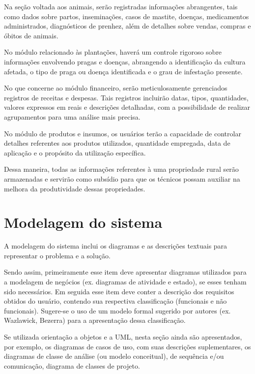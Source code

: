 Na seção voltada aos animais, serão registradas informações abrangentes, tais como dados sobre partos, inseminações, casos de mastite, doenças, medicamentos administrados, diagnósticos de prenhez, além de detalhes sobre vendas, compras e óbitos de animais.

No módulo relacionado às plantações, haverá um controle rigoroso sobre informações envolvendo pragas e doenças, abrangendo a identificação da cultura afetada, o tipo de praga ou doença identificada e o grau de infestação presente.

No que concerne ao módulo financeiro, serão meticulosamente gerenciados registros de receitas e despesas. Tais registros incluirão datas, tipos, quantidades, valores expressos em reais e descrições detalhadas, com a possibilidade de realizar agrupamentos para uma análise mais precisa.

No módulo de produtos e insumos, os usuários terão a capacidade de controlar detalhes referentes aos produtos utilizados, quantidade empregada, data de aplicação e o propósito da utilização específica.

Dessa maneira, todas as informações referentes à uma propriedade rural serão armazenadas e servirão como subsídio para que os técnicos possam auxiliar na melhora da produtividade dessas propriedades.


\section{Modelagem do sistema}\label{sec:modelagemSistema}

A modelagem do sistema inclui os diagramas e as descrições textuais para representar o problema e a solução.

Sendo assim, primeiramente esse item deve apresentar diagramas utilizados para a modelagem de negócios (ex. diagramas de atividade e estado), se esses tenham sido necessários.
Em seguida esse item deve conter a descrição dos requisitos obtidos do usuário, contendo sua respectiva classificação (funcionais e não funcionais). Sugere-se o uso de um modelo formal sugerido por autores (ex. Wazlawick, Bezerra) para a apresentação dessa classificação.

Se utilizada orientação a objetos e a UML, nesta seção ainda são apresentados, por exemplo, os diagramas de casos de uso, com suas descrições suplementares, os diagramas de classe de análise (ou modelo conceitual), de sequência e/ou comunicação, diagrama de classes de projeto.

